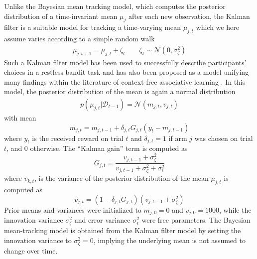 \documentclass[a4paper,natbib]{apa6}
\begin{document}
Unlike the Bayesian mean tracking model, which computes the posterior distribution of a time-invariant mean $\mu_j$ after each new observation, the Kalman filter is a suitable model for tracking a time-varying mean $\mu_{j,t}$ which we here assume varies according to a simple random walk
\begin{align}
\mu_{j, t+1} = \mu_{j,t} + \zeta_{t} \quad \quad \zeta_t \sim \mathcal{N}(0,\sigma_\zeta^2)
\end{align}
Such a Kalman filter model has been used to successfully describe participants' choices in a restless bandit task \citep{speekenbrinkuncertainty} and has also been proposed as a model unifying many findings within the literature of context-free associative learning \citep{kruschke2008bayesian,gershman2015unifying}. In this model, the posterior distribution of the mean is again a normal distribution
\begin{align}
p(\mu_{j,t}|\mathcal{D}_{t-1}) = \mathcal{N}(m_{j,t},v_{j,t})
\end{align}
with mean
\begin{equation}
\label{eq:KalmanMean}
m_{j,t} = m_{j,t-1} + \delta_{j,t}G_{j,t}(y_t - m_{j,t-1})
\end{equation}
where $y_t$ is the received reward on trial $t$ and $\delta_{j,t} = 1$ if arm $j$ was chosen on trial $t$, and 0 otherwise. The ``Kalman gain'' term is computed as
\begin{equation}
\label{eq:KalmanUpdate}
G_{j,t} = \frac{v_{j,t-1} + \sigma_\zeta^2}{v_{j,t-1} + \sigma^2_\zeta + \sigma^2_\epsilon}
\end{equation}
where $v_{k,t}$, is the variance of the posterior distribution of the mean $\mu_{j,t}$ is computed as 
\begin{equation}
\label{KalmanVariance}
v_{j,t} = (1 - \delta_{j,t} G_{j,t})(v_{j,t-1} + \sigma^2_\zeta)
\end{equation}
Prior means and variances were initialized to $m_{j,0}=0$ and $v_{j,0} = 1000$, while the innovation variance $\sigma^2_\zeta$ and error variance $\sigma^2_\epsilon$ were free parameters. The Bayesian mean-tracking model is obtained from the Kalman filter model by setting the innovation variance to $\sigma^2_\zeta = 0$, implying the underlying mean is not assumed to change over time. 

\end{document}
